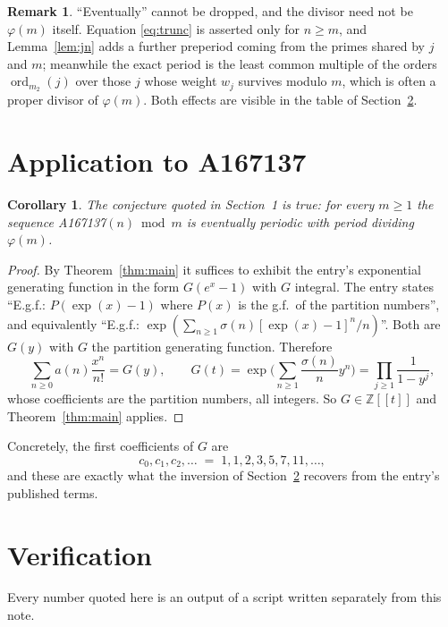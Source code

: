 \documentclass[11pt,a4paper]{article}
\theoremstyle{plain}
\newtheorem{corollary}[theorem]{Corollary}
\theoremstyle{definition}
\newtheorem{remark}[theorem]{Remark}
\newcommand{\ord}{\operatorname{ord}}
\newcommand{\Z}{\mathbb{Z}}
\begin{document}
\begin{remark}
``Eventually'' cannot be dropped, and the divisor need not be $\varphi(m)$ itself.
Equation \eqref{eq:trunc} is asserted only for $n\ge m$, and Lemma~\ref{lem:jn} adds a
further preperiod coming from the primes shared by $j$ and $m$; meanwhile the exact period
is the least common multiple of the orders $\ord_{m_{2}}(j)$ over those $j$ whose weight
$w_{j}$ survives modulo $m$, which is often a proper divisor of $\varphi(m)$. Both effects
are visible in the table of Section~\ref{sec:ver}.
\end{remark}

\section{Application to A167137}\label{sec:apply}

\begin{corollary}\label{cor:this}
The conjecture quoted in Section~1 is true: for every $m\ge1$ the sequence
A167137$(n) \bmod m$ is eventually periodic with period dividing $\varphi(m)$.
\end{corollary}

\begin{proof}
By Theorem~\ref{thm:main} it suffices to exhibit the entry's exponential generating
function in the form $G(e^{x}-1)$ with $G$ integral. The entry states ``E.g.f.: $P(\exp(x)-1)$ where $P(x)$ is the g.f.\ of the partition numbers'', and equivalently ``E.g.f.: $\exp(\sum_{n\ge1}\sigma(n)[\exp(x)-1]^{n}/n)$''. Both are $G(y)$ with $G$ the partition generating function. Therefore
\[
\sum_{n\ge0}a(n)\frac{x^{n}}{n!}=G(y),\qquad G(t)=\exp\!\Big(\sum_{n\ge1}\frac{\sigma(n)}{n}y^{n}\Big)=\prod_{j\ge1}\frac{1}{1-y^{j}} ,
\]
whose coefficients are the partition numbers, all integers. So $G\in\Z[[t]]$ and
Theorem~\ref{thm:main} applies.
\end{proof}

Concretely, the first coefficients of $G$ are
\[
c_{0},c_{1},c_{2},\dots \;=\; 1, 1, 2, 3, 5, 7, 11, \dots ,
\]
and these are exactly what the inversion of Section~\ref{sec:ver} recovers from the
entry's published terms.

\section{Verification}\label{sec:ver}

Every number quoted here is an output of a script written separately from this note.
\end{document}
